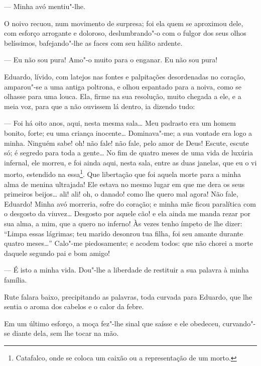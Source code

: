 --- Minha avó mentiu"-lhe.

O noivo recuou, num movimento de surpresa; foi ela quem se aproximou
dele, com esforço arrogante e doloroso, deslumbrando"-o com o fulgor dos
seus olhos belíssimos, bafejando"-lhe as faces com seu hálito ardente.

--- Eu não sou pura! Amo"-o muito para o enganar. Eu não sou pura!

Eduardo, lívido, com latejos nas fontes e palpitações desordenadas no
coração, amparou"-se a uma antiga poltrona, e olhou espantado para a
noiva, como se olhasse para uma louca. Ela, firme na sua resolução,
muito chegada a ele, e a meia voz, para que a não ouvissem lá dentro, ia
dizendo tudo:

--- Foi há oito anos, aqui, nesta mesma sala\ldots{} Meu padrasto era um homem
bonito, forte; eu uma criança inocente\ldots{} Dominava"-me; a sua vontade era
logo a minha. Ninguém sabe! oh! não fale! não fale, pelo amor de Deus!
Escute, escute só; é segredo para toda a gente\ldots{} No fim de quatro meses
de uma vida de luxúria infernal, ele morreu, e foi ainda aqui, nesta
sala, entre as duas janelas, que eu o vi morto, estendido na
essa\footnote{Catafalco, onde se coloca um caixão ou a representação de
  um morto.}. Que libertação que foi aquela morte para a minha alma de
menina ultrajada! Ele estava no mesmo lugar em que me dera os seus
primeiros beijos\ldots{} ali! ali! oh, o danado! como lhe quero mal agora!
Não fale, Eduardo! Minha avó morreria, sofre do coração; e minha mãe
ficou paralítica com o desgosto da viuvez\ldots{} Desgosto por aquele cão! e
ela ainda me manda rezar por sua alma, a mim, que a quero no inferno! Às
vezes tenho ímpeto de lhe dizer: ``Limpa essas lágrimas; teu marido
desonrou tua filha, foi seu amante durante quatro meses\ldots{}'' Calo"-me
piedosamente; e acodem todos: que não chorei a morte daquele segundo pai
e bom amigo!

\asterisc

--- É isto a minha vida. Dou"-lhe a liberdade de restituir a sua palavra
à minha família.

Rute falara baixo, precipitando as palavras, toda curvada para Eduardo,
que lhe sentia o aroma dos cabelos e o calor da febre.

Em um último esforço, a moça fez"-lhe sinal que saísse e ele obedeceu,
curvando"-se diante dela, sem lhe tocar na mão.

\asterisc

